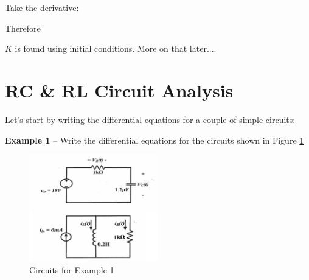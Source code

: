 \documentclass{handout}
\begin{document}
Take the derivative:

Therefore

$K$ is found using initial conditions.  More on that later....

\newpage
\clearpage
\pagebreak

\section{RC \& RL Circuit Analysis}


Let's start by writing the differential equations for a couple of simple circuits:

\textbf{Example 1} -- Write the differential equations for the circuits shown in Figure \ref{fig: Example1}

\begin{figure} [h!]
\centering
\includegraphics[width=0.5\textwidth]{Example1.jpg}
\caption{Circuits for Example 1}
\label{fig: Example1}
\end{figure}
\end{document}
